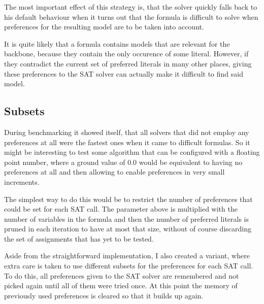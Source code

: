 The most important effect of this strategy is, that the solver quickly falls back to his default behaviour when it turns out that the formula is difficult to solve when preferences for the resulting model are to be taken into account. 

It is quite likely that a formula contains models that are relevant for the backbone, because they contain the only occurence of some literal. However, if they contradict the current set of preferred literals in many other places, giving these preferences to the SAT solver can actually make it difficult to find said model.

\subsection{Subsets}
\label{sec:subsets}
During benchmarking it showed itself, that all solvers that did not employ any preferences at all were the fastest ones when it came to difficult formulas. So it might be interesting to test some algorithm that can be configured with a floating point number, where a ground value of $0.0$ would be equivalent to having no preferences at all and then allowing to enable preferences in very small increments.

The simplest way to do this would be to restrict the number of preferences that could be set for each SAT call. The parameter above is multiplied with the number of variables in the formula and then the number of preferred literals is pruned in each iteration to have at most that size, without of course discarding the set of assignments that has yet to be tested.

Aside from the straightforward implementation, I also created a variant, where extra care is taken to use different subsets for the preferences for each SAT call. To do this, all preferences given to the SAT solver are remembered and not picked again until all of them were tried once. At this point the memory of previously used preferences is cleared so that it builds up again.





